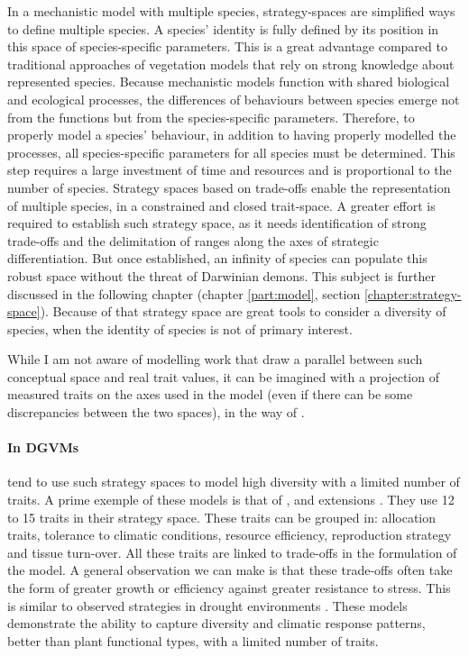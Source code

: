 In a mechanistic model with multiple species, strategy-spaces are simplified ways to define multiple species. A species' identity is fully defined by its position in this space of species-specific parameters. This is a great advantage compared to traditional approaches of vegetation models that rely on strong knowledge about represented species. Because mechanistic models function with shared biological and ecological processes, the differences of behaviours between species emerge not from the functions but from the species-specific parameters. Therefore, to properly model a species' behaviour, in addition to having properly modelled the processes, all species-specific parameters for all species must be determined. This step requires a large investment of time and resources and is proportional to the number of species. Strategy spaces based on trade-offs enable the representation of multiple species, in a constrained and closed trait-space. A greater effort is required to establish such strategy space, as it needs identification of strong trade-offs and the delimitation of ranges along the axes of strategic differentiation. But once established, an infinity of species can populate this robust space without the threat of Darwinian demons. This subject is further discussed in the following chapter (chapter \ref{part:model}, section \ref{chapter:strategy-space}). Because of that strategy space are great tools to consider a diversity of species, when the identity of species is not of primary interest.

While I am not aware of modelling work that draw a parallel between such conceptual space and real trait values, it can be imagined with a projection of measured traits on the axes used in the model (even if there can be some discrepancies between the two spaces), in the way of \citet{pierce_allocating_2013}. 

\paragraph{In DGVMs}


 tend to use such strategy spaces to model high diversity with a limited number of traits. A prime exemple of these models is that of \citet{kleidon_global_2000}, and extensions \parencite{reu_role_2011, pavlick_jena_2013}. They use 12 to 15 traits in their strategy space. These traits can be grouped in: allocation traits, tolerance to climatic conditions, resource efficiency, reproduction strategy and tissue turn-over. All these traits are linked to trade-offs in the formulation of the model. A general observation we can make is that these trade-offs often take the form of greater growth or efficiency against greater resistance to stress. This is similar to observed strategies in drought environments \parencite{kooyers_evolution_2015}. These models \parencite{reu_role_2011, pavlick_jena_2013} demonstrate the ability to capture diversity and climatic response patterns, better than plant functional types, with a limited number of traits.


